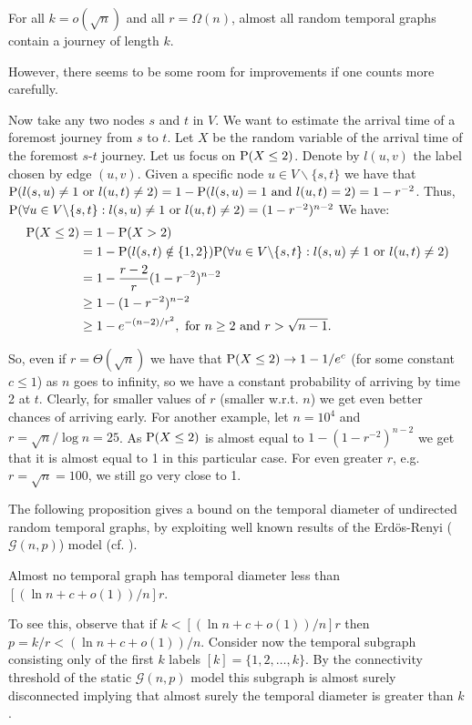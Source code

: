 \documentclass[oribibl, 11pt]{llncs}
\newcommand{\cg}{\mathcal{G}}
\newcommand{\ra}{\rightarrow}
\newcommand{\bs}{\backslash}
\renewcommand{\P}{\textup{P}}
\begin{document}
\begin{theorem}
For all $k=o(\sqrt{n})$ and all $r=\Omega(n)$, almost all random temporal graphs contain a journey of length $k$.
\end{theorem}
However, there seems to be some room for improvements if one counts more carefully.

Now take any two nodes $s$ and $t$ in $V$. We want to estimate the arrival time of a foremost journey from $s$ to $t$. Let $X$ be the random variable of the arrival time of the foremost $s$-$t$ journey. Let us focus on $\P(X\leq 2)$. Denote by $l(u,v)$ the label chosen by edge $(u,v)$. Given a specific node $u\in V\bs\{s,t\}$ we have that $\P(l(s,u)\neq 1 \text{ or } l(u,t)\neq 2)=1-\P(l(s,u)= 1 \text{ and } l(u,t)= 2)=1-r^{-2}$. Thus, $\P(\forall u\in V\bs\{s,t\}: l(s,u)\neq 1 \text{ or } l(u,t)\neq 2)=(1-r^{-2})^{n-2}$  We have:
\begin{align*}
\P(X\leq 2)&=1-\P(X>2)\\
	   &=1-\P(l(s,t)\notin\{1,2\})\P(\forall u\in V\bs\{s,t\}: l(s,u)\neq 1 \text{ or } l(u,t)\neq 2)\\
	   &=1-\frac{r-2}{r}(1-r^{-2})^{n-2}\\
	   &\geq 1-(1-r^{-2})^{n-2}\\
	   &\geq 1-e^{-(n-2)/r^2}, \text{ for } n\geq 2 \text{ and } r>\sqrt{n-1}.
\end{align*}

So, even if $r=\Theta(\sqrt{n})$ we have that $\P(X\leq 2)\ra 1-1/e^c$ (for some constant $c\leq 1$) as $n$ goes to infinity, so we have a constant probability of arriving by time 2 at $t$. Clearly, for smaller values of $r$ (smaller w.r.t. $n$) we get even better chances of arriving early. For another example, let $n=10^4$ and $r=\sqrt{n}/\log n=25$. As $\P(X\leq 2)$ is almost equal to $1-(1-r^{-2})^{n-2}$ we get that it is almost equal to 1 in this particular case. For even greater $r$, e.g. $r=\sqrt{n}=100$, we still go very close to 1.

The following proposition gives a bound on the temporal diameter of undirected random temporal graphs, by exploiting well known results of the Erd\" os-Renyi ($\cg(n,p)$) model (cf. \cite{Bol01}).

\begin{proposition}
Almost no temporal graph has temporal diameter less than $[(\ln n +c+o(1))/n]r$.
\end{proposition}

To see this, observe that if $k<[(\ln n +c+o(1))/n]r$ then $p=k/r<(\ln n +c+o(1))/n$. Consider now the temporal subgraph consisting only of the first $k$ labels $[k]=\{1,2,\ldots,k\}$. By the connectivity threshold of the static $\cg(n,p)$ model this subgraph is almost surely disconnected implying that almost surely the temporal diameter is greater than $k$.
\end{document}
